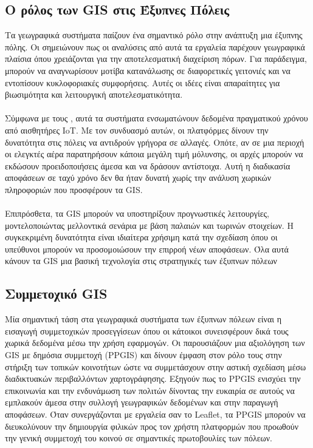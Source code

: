 \subsection{Ο ρόλος των GIS στις Έξυπνες Πόλεις}
Τα γεωγραφικά συστήματα παίζουν ένα σημαντικό ρόλο στην ανάπτυξη μια έξυπνης πόλης. Οι \textcite{zhaoexploring} σημειώνουν πως οι αναλύσεις από αυτά τα εργαλεία παρέχουν γεωγραφικά πλαίσια όπου χρειάζονται για την αποτελεσματική διαχείριση πόρων. Για παράδειγμα, μπορούν να αναγνωρίσουν μοτίβα κατανάλωσης σε διαφορετικές γειτονιές και να εντοπίσουν κυκλοφοριακές συμφορήσεις. Αυτές οι ιδέες είναι απαραίτητες για βιωσιμότητα και λειτουργική αποτελεσματικότητα. 
\\
\\
Σύμφωνα με τους \textcite{bovkir2021big}, αυτά τα συστήματα ενσωματώνουν δεδομένα πραγματικού χρόνου από αισθητήρες IoT. Με τον συνδυασμό αυτών, οι πλατφόρμες δίνουν την δυνατότητα στις πόλεις να αντιδρούν γρήγορα σε αλλαγές. Οπότε, αν σε μια περιοχή οι ελεγκτές αέρα παρατηρήσουν κάποια μεγάλη τιμή μόλυνσης, οι αρχές μπορούν να εκδώσουν προειδοποιήσεις άμεσα και να δράσουν αντίστοιχα. Αυτή η διαδικασία αποφάσεων σε ταχύ χρόνο δεν θα ήταν δυνατή χωρίς την ανάλυση χωρικών πληροφοριών που προσφέρουν τα GIS. 
\\
\\
Επιπρόσθετα, τα GIS μπορούν να υποστηρίξουν προγνωστικές λειτουργίες, μοντελοποιώντας μελλοντικά σενάρια με βάση παλαιών και τωρινών στοιχείων. Η συγκεκριμένη δυνατότητα είναι ιδιαίτερα χρήσιμη κατά την σχεδίαση όπου οι υπεύθυνοι μπορούν να προσομοιώσουν την επιρροή νέων αποφάσεων. Όλα αυτά κάνουν τα GIS μια βασική τεχνολογία στις στρατηγικές των έξυπνων πόλεων
\\
\subsection{Συμμετοχικό GIS}
Μία σημαντική τάση στα γεωγραφικά συστήματα των έξυπνων πόλεων είναι η εισαγωγή συμμετοχικών προσεγγίσεων όπου οι κάτοικοι συνεισφέρουν δικά τους χωρικά δεδομένα μέσω την χρήση εφαρμογών. Οι \textcite{bakowska2021use} παρουσιάζουν μια αξιολόγηση των GIS με δημόσια συμμετοχή (PPGIS) και δίνουν έμφαση στον ρόλο τους στην στήριξη των τοπικών κοινοτήτων ώστε να συμμετάσχουν στην αστική σχεδίαση μέσω διαδικτυακών περιβαλλόντων χαρτογράφησης. Εξηγούν πως το PPGIS ενισχύει την επικοινωνία και την ενδυνάμωση των πολιτών δίνοντας την ευκαιρία σε αυτούς να εμπλακούν άμεσα στην συλλογή γεωγραφικών δεδομένων και στην παραγωγή αποφάσεων. Όταν συνεργάζονται με εργαλεία σαν το Leaflet, τα PPGIS μπορούν να διευκολύνουν την δημιουργία φιλικών προς τον χρήστη πλατφορμών που προωθούν την γενική συμμετοχή του κοινού σε σημαντικές πρωτοβουλίες των πόλεων. 
\\
